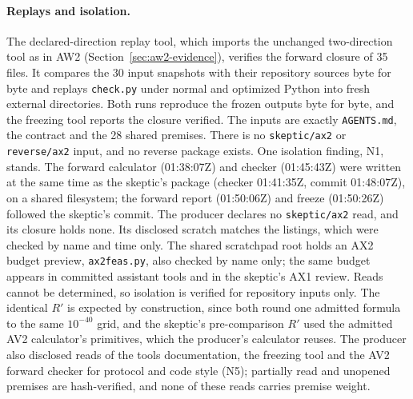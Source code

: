 \paragraph{Replays and isolation.}
The declared-direction replay tool, which imports the unchanged two-direction
tool as in AW2 (Section~\ref{sec:aw2-evidence}), verifies the forward closure
of 35 files. It compares the 30 input snapshots with their repository sources
byte for byte and replays \texttt{check.py} under normal and optimized Python
into fresh external directories. Both runs reproduce the frozen outputs byte
for byte, and the freezing tool reports the closure verified. The inputs are
exactly \texttt{AGENTS.md}, the contract and the 28 shared premises. There is
no \texttt{skeptic/ax2} or \texttt{reverse/ax2} input, and no reverse package
exists. One isolation finding, N1, stands. The forward calculator (01:38:07Z)
and checker (01:45:43Z) were written at the same time as the skeptic's
package (checker 01:41:35Z, commit 01:48:07Z), on a shared filesystem; the
forward report (01:50:06Z) and freeze (01:50:26Z) followed the skeptic's
commit. The producer declares no \texttt{skeptic/ax2} read, and its closure
holds none. Its disclosed scratch matches the listings, which were checked by
name and time only. The shared scratchpad root holds an AX2 budget preview,
\texttt{ax2feas.py}, also checked by name only; the same budget appears in
committed assistant tools and in the skeptic's AX1 review. Reads cannot be
determined, so isolation is verified for repository inputs only. The identical
$R'$ is expected by construction, since both round one admitted formula to
the same $10^{-40}$ grid, and the skeptic's pre-comparison $R'$ used the
admitted AV2 calculator's primitives, which the producer's calculator reuses.
The producer also disclosed reads of the tools documentation, the freezing
tool and the AV2 forward checker for protocol and code style (N5); partially
read and unopened premises are hash-verified, and none of these reads carries
premise weight.

